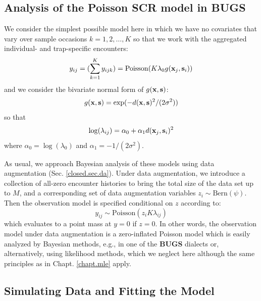 \subsection{Analysis of the Poisson SCR model in BUGS}

We consider the simplest possible model here in which we have no
covariates that vary over sample occasions  $k=1,2,\ldots,K$
so that we work with
the aggregated individual- and trap-specific encounters:
\[
y_{ij} = (\sum_{k=1}^{K} y_{ijk}) =  \mbox{Poisson}(K  \lambda_{0}
g({\bf x}_{j},{\bf s}_{i}) )
\]
and we consider the bivariate normal form of $g({\bf x},{\bf s})$:
\[
g({\bf x},{\bf s}) = \exp( -d({\bf x}, {\bf
  s})^{2} /(2\sigma^{2}))
\]
so that
\[
\log( \lambda_{ij})  =\alpha_{0} + \alpha_{1} d({\bf x}_{j}, {\bf s}_{i})^2
\]
where $\alpha_{0} = \log(\lambda_{0})$ and $\alpha_1 = -1/(2\sigma^2)$.


As usual, we approach Bayesian analysis of these models using data
augmentation (Sec. \ref{closed.sec.da}).  Under data augmentation, we
introduce a collection of all-zero encounter histories to bring the
total size of the data set up to $M$, and a corresponding set of data
augmentation variables $z_{i} \sim \mbox{Bern}(\psi)$. Then the
observation model is specified conditional on $z$ according to:
\[
y_{ij} \sim  \mbox{Poisson}(z_{i} K  \lambda_{ij})
\]
which evaluates to a point mass at $y=0$ if $z=0$.  In other words,
the observation model under data augmentation is a zero-inflated
Poisson model which is easily analyzed by Bayesian methods, e.g., in
one of the {\bf BUGS} dialects or, alternatively, using likelihood
methods, which we neglect here although the same principles as in
Chapt. \ref{chapt.mle} apply.


\subsection{Simulating Data and Fitting the Model}


